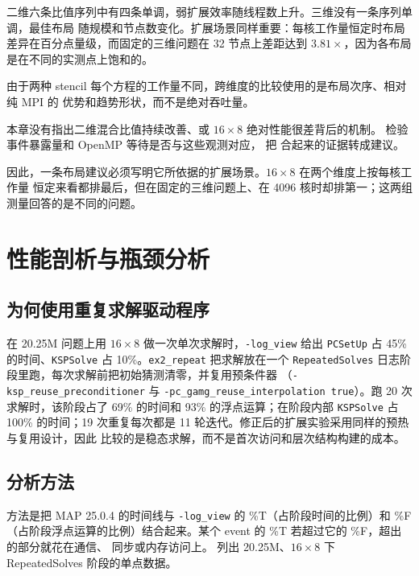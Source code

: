 \documentclass[11pt,a4paper,oneside]{report}
\begin{document}
二维六条比值序列中有四条单调，弱扩展效率随线程数上升。三维没有一条序列单调，最佳布局
随规模和节点数变化。扩展场景同样重要：每核工作量恒定时布局差异在百分点量级，而固定的三维问题在
32 节点上差距达到 $3.81\times$，因为各布局是在不同的实测点上饱和的。

由于两种 stencil 每个方程的工作量不同，跨维度的比较使用的是布局次序、相对纯 MPI 的
优势和趋势形状，而不是绝对吞吐量。

本章没有指出二维混合比值持续改善、或 $16\times8$ 绝对性能很差背后的机制。
 检验事件暴露量和 OpenMP 等待是否与这些观测对应， 把
合起来的证据转成建议。

因此，一条布局建议必须写明它所依据的扩展场景。$16\times8$ 在两个维度上按每核工作量
恒定来看都排最后，但在固定的三维问题上、在 4096 核时却排第一；这两组测量回答的是不同的问题。

\chapter{性能剖析与瓶颈分析}
\label{ch:profiling}

\section{为何使用重复求解驱动程序}
\label{sec:whyrepeat}
在 20.25M 问题上用 $16\times8$ 做一次单次求解时，\texttt{-log\_view} 给出 \texttt{PCSetUp}
占 45\% 的时间、\texttt{KSPSolve} 占 10\%。\texttt{ex2\_repeat} 把求解放在一个
\texttt{RepeatedSolves} 日志阶段里跑，每次求解前把初始猜测清零，并复用预条件器
（\texttt{-ksp\_reuse\_preconditioner} 与 \texttt{-pc\_gamg\_reuse\_interpolation true}）。跑
20 次求解时，该阶段占了 69\% 的时间和 93\% 的浮点运算；在阶段内部 \texttt{KSPSolve} 占 100\%
的时间；19 次重复每次都是 11 轮迭代。修正后的扩展实验采用同样的预热与复用设计，因此
 比较的是稳态求解，而不是首次访问和层次结构构建的成本。

\section{分析方法}
\label{sec:analysis-method}
方法是把 MAP 25.0.4 的时间线与 \texttt{-log\_view} 的 \%T（占阶段时间的比例）和 \%F
（占阶段浮点运算的比例）结合起来。某个 event 的 \%T 若超过它的 \%F，超出的部分就花在通信、
同步或内存访问上。 列出 20.25M、$16\times8$ 下 RepeatedSolves 阶段的单点数据。
\end{document}
